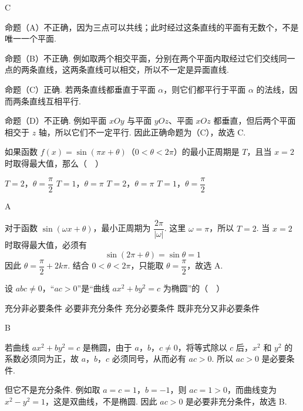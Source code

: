 \begin{answer}
C
\end{answer}

\begin{solution}
命题（A）不正确，因为三点可以共线；此时经过这条直线的平面有无数个，不是唯一一个平面.

命题（B）不正确. 例如取两个相交平面，分别在两个平面内取经过它们交线同一点的两条直线，这两条直线可以相交，所以不一定是异面直线.

命题（C）正确. 若两条直线都垂直于平面 \(\alpha\)，则它们都平行于平面 \(\alpha\) 的法线，因而两条直线互相平行.

命题（D）不正确. 例如平面 \(xOy\) 与平面 \(yOz\)、平面 \(xOz\) 都垂直，但后两个平面相交于 \(z\) 轴，所以它们不一定平行. 因此正确命题为（C），故选 C.
\end{solution}

\begin{problem}
如果函数 \(f(x)=\sin(\pi x+\theta)\)（\(0<\theta<2\pi\)）的最小正周期是 \(T\)，且当 \(x=2\) 时取得最大值，那么（\(\quad\)）

\choices
    {\(T=2\)，\(\theta=\dfrac{\pi}{2}\)}
    {\(T=1\)，\(\theta=\pi\)}
    {\(T=2\)，\(\theta=\pi\)}
    {\(T=1\)，\(\theta=\dfrac{\pi}{2}\)}
\end{problem}

\begin{answer}
A
\end{answer}

\begin{solution}
对于函数 \(\sin(\omega x+\theta)\)，最小正周期为 \(\dfrac{2\pi}{|\omega|}\). 这里 \(\omega=\pi\)，所以 \(T=2\). 当 \(x=2\) 时取得最大值，必须有
\[
\sin(2\pi+\theta)=\sin\theta=1
\]
因此 \(\theta=\dfrac{\pi}{2}+2k\pi\). 结合 \(0<\theta<2\pi\)，只能取 \(\theta=\dfrac{\pi}{2}\)，故选 A.
\end{solution}

\begin{problem}
设 \(abc\ne0\)，“\(ac>0\)”是“曲线 \(ax^2+by^2=c\) 为椭圆”的（\(\quad\)）

\choices
    {充分非必要条件}
    {必要非充分条件}
    {充分必要条件}
    {既非充分又非必要条件}
\end{problem}

\begin{answer}
B
\end{answer}

\begin{solution}
若曲线 \(ax^2+by^2=c\) 是椭圆，由于 \(a\)，\(b\)，\(c\ne0\)，将等式除以 \(c\) 后，\(x^2\) 和 \(y^2\) 的系数必须同为正，故 \(a\)，\(b\)，\(c\) 必须同号，从而必有 \(ac>0\). 所以 \(ac>0\) 是必要条件.

但它不是充分条件. 例如取 \(a=c=1\)，\(b=-1\)，则 \(ac=1>0\)，而曲线变为 \(x^2-y^2=1\)，这是双曲线，不是椭圆. 因此 \(ac>0\) 是必要非充分条件，故选 B.
\end{solution}

